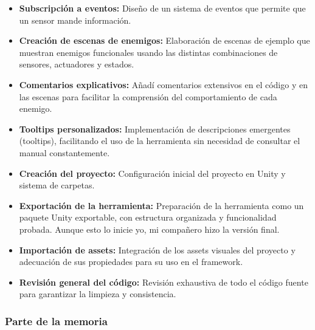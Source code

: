 \begin{itemize}
  \item \textbf{Subscripción a eventos:} Diseño de un sistema de eventos que permite que un sensor mande información.
  \item \textbf{Creación de escenas de enemigos:} Elaboración de escenas de ejemplo que muestran enemigos funcionales usando las distintas combinaciones de sensores, actuadores y estados.
  \item \textbf{Comentarios explicativos:} Añadí comentarios extensivos en el código y en las escenas para facilitar la comprensión del comportamiento de cada enemigo.
  \item \textbf{Tooltips personalizados:} Implementación de descripciones emergentes (tooltips), facilitando el uso de la herramienta sin necesidad de consultar el manual constantemente.
 \item \textbf{Creación del proyecto:} Configuración inicial del proyecto en Unity y sistema de carpetas.
 \item \textbf{Exportación de la herramienta:} Preparación de la herramienta como un paquete Unity exportable, con estructura organizada y funcionalidad probada. Aunque esto lo inicie yo, mi compañero hizo la versión final.
  \item \textbf{Importación de assets:} Integración de los assets visuales del proyecto y adecuación de sus propiedades para su uso en el framework.
  \item \textbf{Revisión general del código:} Revisión exhaustiva de todo el código fuente para garantizar la limpieza y consistencia.
\end{itemize}

\subsubsection{Parte de la memoria}

